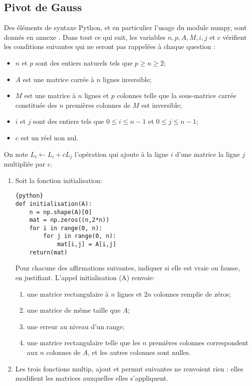 \subsection{Pivot de Gauss}



\begin{exercice} 
Des éléments de syntaxe Python, et en particulier l'usage du module numpy, sont donnés en annexe . Dans tout ce qui suit, les variables $n, p, A, M, i, j$ et $c$ vérifient les conditions suivantes qui ne seront pas rappelées à chaque question :
\begin{itemize}


\item $n$ et $p$ sont des entiers naturels tels que $p \geq n \geq 2$;
\item $A$ est une matrice carrée à $n$ lignes inversible;
\item $M$ est une matrice à $n$ lignes et $p$ colonnes telle que la sous-matrice carrée constituée des $n$ premières colonnes de $M$ est inversible;
\item  $i$ et $j$ sont des entiers tels que $0 \leq i \leq n-1$ et $0 \leq j \leq n-1$;
\item  $c$ est un réel non nul.
\end{itemize}
On note $L_{i} \leftarrow L_{i}+c L_{j}$ l'opération qui ajoute à la ligne $i$ d'une matrice la ligne $j$ multipliée par c.
\begin{enumerate}


\item Soit la fonction initialisation:
\begin{lstlisting}{python}
def initialisation(A):
    n = np.shape(A)[0]
    mat = np.zeros((n,2*n))
    for i in range(0, n):
        for j in range(0, n):
            mat[i,j] = A[i,j]
    return(mat)
\end{lstlisting}
Pour chacune des affirmations suivantes, indiquer si elle est vraie ou fausse, en justifiant. L'appel initialisation (A) renvoie:
\begin{enumerate}


\item une matrice rectangulaire à $n$ lignes et $2 n$ colonnes remplie de zéros;
\item une matrice de même taille que $A$;
\item une erreur au niveau d'un range;
\item une matrice rectangulaire telle que les $n$ premières colonnes correspondent aux $n$ colonnes de $A$, et les autres colonnes sont nulles.\end{enumerate}
\item  Les trois fonctions multip, ajout et permut suivantes ne renvoient rien : elles modifient les matrices auxquelles elles s'appliquent.
\begin{enumerate}



\end{enumerate}
\end{enumerate}
\end{exercice}
